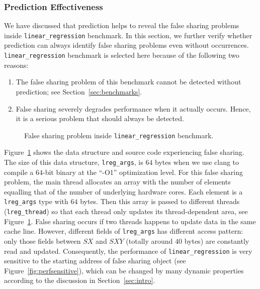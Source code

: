 \subsubsection{Prediction Effectiveness}
\label{sec:predicteval}
We have discussed that prediction helps to reveal the false sharing problems inside \texttt{linear\_regression} benchmark. In this section, we further verify whether prediction can always identify 
false sharing problems even without occurrences.
\texttt{linear\_regression} benchmark is selected here because of the following two reasons:
\begin{enumerate}
\item
The false sharing problem of this benchmark cannot be detected without prediction; see Section~\ref{sec:benchmarks}. 

\item
False sharing severely degrades performance when it actually occurs. 
Hence, it is a serious problem that should always be detected. 
\end{enumerate}

\begin{figure}[!ht]
{\centering
\subfigure{}
\caption{False sharing problem inside \texttt{linear\_regression} benchmark.
\label{fig:linearregression}}
}
\end{figure}

Figure~\ref{fig:linearregression} shows the data structure and source code
experiencing false sharing.
The size of this data structure, \texttt{lreg\_args}, is $64$ bytes 
when we use clang to compile a $64$-bit binary at the ``-O1'' optimization level.
For this false sharing problem, the main thread allocates an array with the number of elements equalling
that of the number of underlying hardware cores.
Each element is a \texttt{lreg\_args} type with $64$ bytes. 
Then this array is passed to different threads (\texttt{lreg\_thread}) 
so that each thread only updates its thread-dependent area, see Figure~\ref{fig:linearregression}.
False sharing occurs if two threads happens to update data in the same cache line. 
However, different fields of \texttt{lreg\_args} has different access pattern:
only those fields between $SX$ and $SXY$ (totally around $40$ bytes) are constantly read and updated.
Consequently, the performance of \texttt{linear\_regression} is very sensitive to 
the starting address of false sharing object (see Figure~\ref{fig:perfsensitive}),
which can be changed by many dynamic properties according
to the discussion in Section~\ref{sec:intro}.


